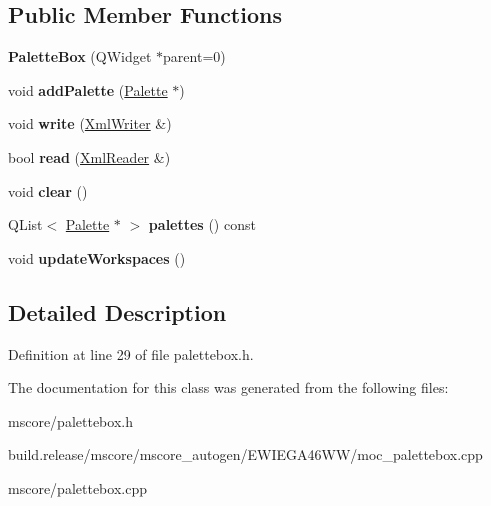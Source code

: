 \subsection*{Public Member Functions}
\begin{DoxyCompactItemize}
\item 
\mbox{\label{class_ms_1_1_palette_box_a73f161020771a0492487f558b4be9dca}} 
{\bfseries Palette\+Box} (Q\+Widget $\ast$parent=0)
\item 
\mbox{\label{class_ms_1_1_palette_box_a6d378701f7ba2c4426367752b6bc034c}} 
void {\bfseries add\+Palette} (\hyperlink{class_ms_1_1_palette}{Palette} $\ast$)
\item 
\mbox{\label{class_ms_1_1_palette_box_a3bc852c5a5d5c767f27c2526b9d6a442}} 
void {\bfseries write} (\hyperlink{class_ms_1_1_xml_writer}{Xml\+Writer} \&)
\item 
\mbox{\label{class_ms_1_1_palette_box_abe877dbed9a7c64051c044f4e636c480}} 
bool {\bfseries read} (\hyperlink{class_ms_1_1_xml_reader}{Xml\+Reader} \&)
\item 
\mbox{\label{class_ms_1_1_palette_box_a4965eb895ad3e7abf07b848dbf052959}} 
void {\bfseries clear} ()
\item 
\mbox{\label{class_ms_1_1_palette_box_a2566e5b625a620219b72f9362679eb49}} 
Q\+List$<$ \hyperlink{class_ms_1_1_palette}{Palette} $\ast$ $>$ {\bfseries palettes} () const
\item 
\mbox{\label{class_ms_1_1_palette_box_a579c4edb7de5b2da9c03f15ac763a1b4}} 
void {\bfseries update\+Workspaces} ()
\end{DoxyCompactItemize}


\subsection{Detailed Description}


Definition at line 29 of file palettebox.\+h.



The documentation for this class was generated from the following files\+:\begin{DoxyCompactItemize}
\item 
mscore/palettebox.\+h\item 
build.\+release/mscore/mscore\+\_\+autogen/\+E\+W\+I\+E\+G\+A46\+W\+W/moc\+\_\+palettebox.\+cpp\item 
mscore/palettebox.\+cpp\end{DoxyCompactItemize}
